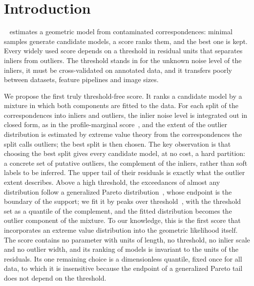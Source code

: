 \section{Introduction}
\label{sec:intro}

\ransac~\cite{Fischler1981} estimates a geometric model from contaminated
correspondences: minimal samples generate candidate models, a score ranks
them, and the best one is kept.  Every widely used score depends on a
threshold in residual units that separates inliers from outliers.  The
threshold stands in for the unknown noise level of the inliers, it must be
cross-validated on annotated data, and it transfers poorly between
datasets, feature pipelines and image sizes.

We propose the first truly threshold-free \ransac score.  It ranks a
candidate model by a \gaussunif mixture in which both components are fitted
to the data.  For each split of the correspondences into inliers and
outliers, the inlier noise level is integrated out in closed form, as in the
profile-marginal score~\cite{Pritts2026}, and the extent of the outlier
distribution is estimated by extreme value theory from the correspondences
the split calls outliers; the best split is then chosen.  The key
observation is that choosing the best split gives every candidate model, at
no cost, a hard partition: a concrete set of putative outliers, the
complement of the inliers, rather than soft labels to be inferred.  The
upper tail of their residuals is exactly what the outlier extent
describes.  Above a high
threshold, the exceedances of almost any distribution follow a generalized
Pareto distribution~\cite{Pickands1975,Balkema1974}, whose endpoint is the
boundary of the support; we fit it by peaks over
threshold~\cite{Coles2001,Hosking1987}, with the threshold set as a
quantile of the complement, and the fitted distribution becomes the outlier
component of the mixture.  To our knowledge, this is the first \ransac score
that incorporates an extreme value distribution into the geometric
likelihood itself.  The score contains no parameter with units of
length, no threshold, no inlier scale and no outlier width, and its
ranking of models is invariant to the units of the residuals.  Its one
remaining choice is a dimensionless quantile, fixed once for all data, to
which it is insensitive because the endpoint of a generalized Pareto tail
does not depend on the threshold.

